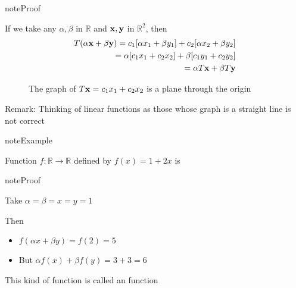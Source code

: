 \documentclass[letterpaper,10pt,english]{jupyterBook}
\begin{document}
\begin{sphinxadmonition}{note}{Proof}

\sphinxAtStartPar
If we take any \(\alpha, \beta\) in \(\mathbb{R}\) and
\({\bf x}, {\bf y}\) in \(\mathbb{R}^2\), then
\begin{equation*}
\begin{split}
%
T(\alpha {\bf x} + \beta {\bf y})
= c_1 [\alpha x_1 + \beta y_1] + c_2 [\alpha x_2 + \beta y_2]
\\
= \alpha [c_1 x_1 + c_2 x_2] + \beta [c_1 y_1 + c_2 y_2]
\\
= \alpha T {\bf x} + \beta T {\bf y} 
%
\end{split}
\end{equation*}\end{sphinxadmonition}

\begin{figure}[htbp]
\centering
\capstart

\noindent{}
\caption{The graph of \(T {\bf x} = c_1 x_1 + c_2 x_2\) is a plane
through the origin}\label{\detokenize{05.linear_algebra:id12}}\end{figure}

\sphinxAtStartPar
Remark: Thinking of linear functions as those whose graph is a straight
line is not correct

\begin{sphinxadmonition}{note}{Example}

\sphinxAtStartPar
Function \(f \colon \mathbb{R} \to \mathbb{R}\) defined by \(f(x) = 1 + 2x\) is 
\end{sphinxadmonition}

\begin{sphinxadmonition}{note}{Proof}

\sphinxAtStartPar
Take \(\alpha = \beta = x = y = 1\)

\sphinxAtStartPar
Then
\begin{itemize}
\item {} 
\sphinxAtStartPar
\(f(\alpha x + \beta y) = f(2) = 5\)

\item {} 
\sphinxAtStartPar
But \(\alpha f(x) + \beta f(y) = 3 + 3 = 6\)

\end{itemize}
\end{sphinxadmonition}

\sphinxAtStartPar
This kind of function is called an  function
\end{document}
